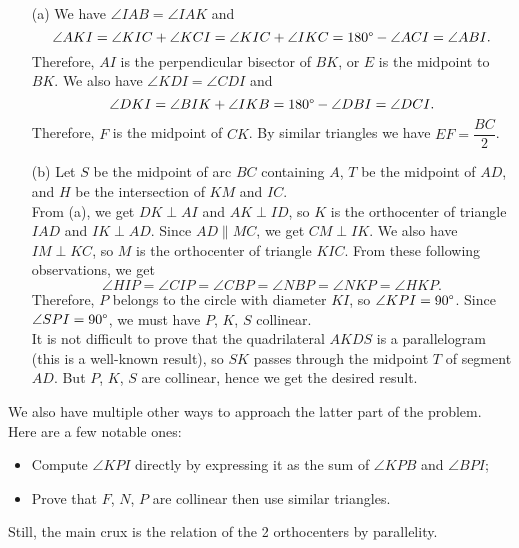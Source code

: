 \documentclass[11pt]{article}
\begin{document}
        \begin{solution}
            \hfill
            \begin{enumerate}
                \item[(a)] We have \(\angle IAB = \angle IAK\) and
                \[\angle AKI = \angle KIC + \angle KCI = \angle KIC + \angle IKC = 180 \degree - \angle ACI = \angle ABI.\]
                Therefore, \(AI\) is the perpendicular bisector of \(BK\), or \(E\) is the midpoint to \(BK\). We also have \(\angle KDI = \angle CDI\) and
                \[\angle DKI = \angle BIK + \angle IKB = 180 \degree - \angle DBI = \angle DCI.\]
                Therefore, \(F\) is the midpoint of \(CK\). By similar triangles we have \(EF = \dfrac{BC}{2}\).
                
                \item[(b)] Let \(S\) be the midpoint of arc \(BC\) containing \(A\), \(T\) be the midpoint of \(AD\), and \(H\) be the intersection of \(KM\) and \(IC\).\\
                From (a), we get \(DK \perp AI\) and \(AK \perp ID\), so \(K\) is the orthocenter of triangle \(IAD\) and \(IK \perp AD\). Since \(AD \parallel MC\), we get \(CM \perp IK\). We also have \(IM \perp KC\), so \(M\) is the orthocenter of triangle \(KIC\). From these following observations, we get
                \[\angle HIP = \angle CIP = \angle CBP = \angle NBP = \angle NKP = \angle HKP.\]
                Therefore, \(P\) belongs to the circle with diameter \(KI\), so \(\angle KPI = 90 \degree\). Since \(\angle SPI = 90 \degree\), we must have \(P\), \(K\), \(S\) collinear.\\
                It is not difficult to prove that the quadrilateral \(AKDS\) is a parallelogram (this is a well-known result), so \(SK\) passes through the midpoint \(T\) of segment \(AD\). But \(P\), \(K\), \(S\) are collinear, hence we get the desired result.
            \end{enumerate}
        \end{solution}

        \begin{remark}
            We also have multiple other ways to approach the latter part of the problem. Here are a few notable ones:
            
            \begin{itemize}
                \item Compute \(\angle KPI\) directly by expressing it as the sum of \(\angle KPB\) and \(\angle BPI\);
                \item Prove that \(F\), \(N\), \(P\) are collinear then use similar triangles.
            \end{itemize}

            Still, the main crux is the relation of the 2 orthocenters by parallelity.
        \end{remark}
\end{document}
